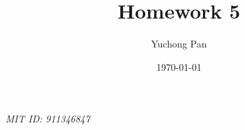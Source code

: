 \documentclass[letterpaper, reqno,11pt]{article}
\begin{document}
\title{Homework 5}
\author{Yuchong Pan}
\date{\today}
\newtheorem{theorem}{Theorem}
\newtheorem{lemma}[theorem]{Lemma}
\newtheorem{corollary}[theorem]{Corollary}
\newtheorem{fact}[theorem]{Fact}
\newtheorem{proposition}[theorem]{Proposition}
\newtheorem{claim}{Claim}
\newtheorem{exercise}{Exercise}
\theoremstyle{definition}
\newtheorem{definition}[theorem]{Definition}
\newtheorem{solution}{Solution}
%

\begin{framed}
 \hfill \thedate
\begin{center}
\Large{\thetitle}
\end{center}
 \hfill {\em MIT ID: 911346847}
\end{framed}
\end{document}
